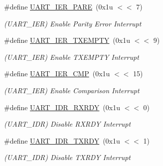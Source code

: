 \begin{DoxyCompactItemize}
\mbox{\label{group__SAMV71__UART_gacc9ba611c50f7b0bfe1cc1ce07abdbc7}} 
\#define \mbox{\hyperlink{group__SAMV71__UART_gacc9ba611c50f7b0bfe1cc1ce07abdbc7}{U\+A\+R\+T\+\_\+\+I\+E\+R\+\_\+\+P\+A\+RE}}~(0x1u $<$$<$ 7)
\begin{DoxyCompactList}\small\item\em (U\+A\+R\+T\+\_\+\+I\+ER) Enable Parity Error Interrupt \end{DoxyCompactList}\item 
\mbox{\label{group__SAMV71__UART_gafb01f4aeae498bfbf583c41acfbd778a}} 
\#define \mbox{\hyperlink{group__SAMV71__UART_gafb01f4aeae498bfbf583c41acfbd778a}{U\+A\+R\+T\+\_\+\+I\+E\+R\+\_\+\+T\+X\+E\+M\+P\+TY}}~(0x1u $<$$<$ 9)
\begin{DoxyCompactList}\small\item\em (U\+A\+R\+T\+\_\+\+I\+ER) Enable T\+X\+E\+M\+P\+TY Interrupt \end{DoxyCompactList}\item 
\mbox{\label{group__SAMV71__UART_ga2004f929d93784f4d125359d25bfd6c6}} 
\#define \mbox{\hyperlink{group__SAMV71__UART_ga2004f929d93784f4d125359d25bfd6c6}{U\+A\+R\+T\+\_\+\+I\+E\+R\+\_\+\+C\+MP}}~(0x1u $<$$<$ 15)
\begin{DoxyCompactList}\small\item\em (U\+A\+R\+T\+\_\+\+I\+ER) Enable Comparison Interrupt \end{DoxyCompactList}\item 
\mbox{\label{group__SAMV71__UART_ga444de2ead3afe527844d4f09a5f261d7}} 
\#define \mbox{\hyperlink{group__SAMV71__UART_ga444de2ead3afe527844d4f09a5f261d7}{U\+A\+R\+T\+\_\+\+I\+D\+R\+\_\+\+R\+X\+R\+DY}}~(0x1u $<$$<$ 0)
\begin{DoxyCompactList}\small\item\em (U\+A\+R\+T\+\_\+\+I\+DR) Disable R\+X\+R\+DY Interrupt \end{DoxyCompactList}\item 
\mbox{\label{group__SAMV71__UART_gab9d2b444a3c078333a81dc83eb3858fa}} 
\#define \mbox{\hyperlink{group__SAMV71__UART_gab9d2b444a3c078333a81dc83eb3858fa}{U\+A\+R\+T\+\_\+\+I\+D\+R\+\_\+\+T\+X\+R\+DY}}~(0x1u $<$$<$ 1)
\begin{DoxyCompactList}\small\item\em (U\+A\+R\+T\+\_\+\+I\+DR) Disable T\+X\+R\+DY Interrupt \end{DoxyCompactList}\item 
$$
\end{DoxyCompactItemize}
